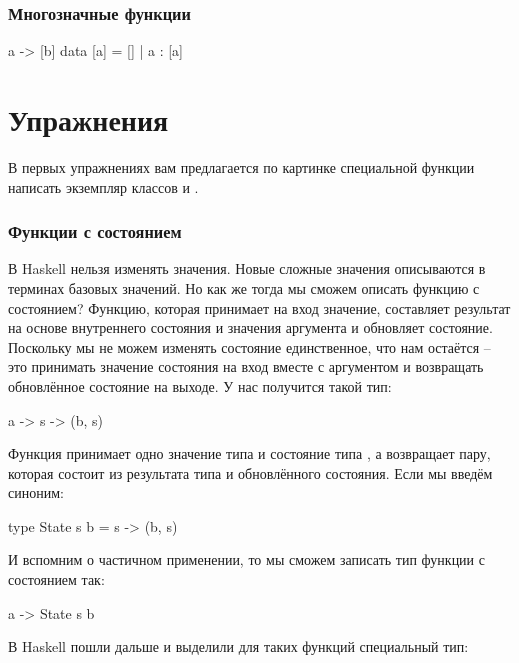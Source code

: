 \subsubsection{Многозначные функции}

\begin{code}
a -> [b]
data [a] = [] | a : [a]
\end{code}

\section{Упражнения}

 В первых упражнениях вам предлагается по
 картинке специальной функции написать экземпляр
 классов  и . 


\subsubsection{Функции с состоянием}


В Haskell нельзя изменять значения. Новые сложные значения
описываются в терминах базовых значений. Но как же тогда
мы сможем описать функцию с состоянием? Функцию,
которая принимает на вход значение, составляет результат
на основе внутреннего состояния и значения аргумента и
обновляет состояние. Поскольку мы не можем изменять состояние
единственное, что нам остаётся -- это принимать значение
состояния на вход вместе с аргументом и возвращать
обновлённое состояние на выходе. У нас получится такой тип:

\begin{code}
a -> s -> (b, s)
\end{code}

Функция принимает одно значение типа  и 
состояние типа , а возвращает пару, которая
состоит из результата типа  и обновлённого 
состояния. Если мы введём синоним:

\begin{code}
type State s b = s -> (b, s)
\end{code}

И вспомним о частичном применении, то мы сможем
записать тип функции с состоянием так:

\begin{code}
a -> State s b 
\end{code}

В Haskell пошли дальше и выделили для таких
функций специальный тип:


